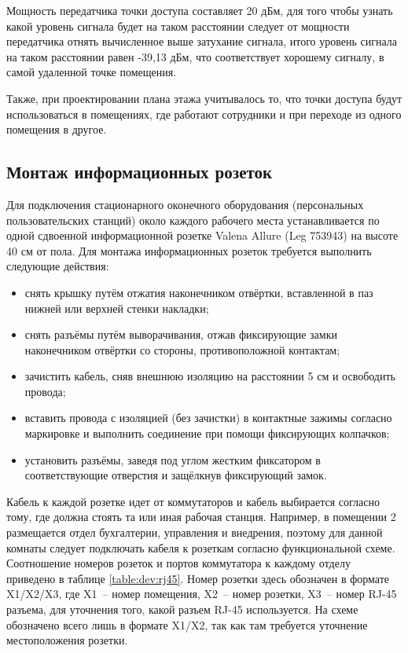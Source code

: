 Мощность передатчика точки доступа составляет 20 дБм, для того чтобы узнать какой уровень сигнала будет на таком 
расстоянии следует от мощности передатчика отнять вычисленное выше затухание сигнала, итого уровень сигнала на 
таком расстоянии равен -39,13 дБм, что соответствует хорошему сигналу, в самой удаленной точке помещения. 

Также, при проектировании плана этажа учитывалось то, что точки доступа будут использоваться в помещениях, где работают сотрудники
и при переходе из одного помещения в другое.

\subsection{Монтаж информационных розеток}

Для подключения стационарного оконечного оборудования (персональных пользовательских станций) около каждого рабочего места устанавливается 
по одной сдвоенной информационной розетке Valena Allure (Leg 753943) на высоте 40 см от пола. Для монтажа информационных розеток 
требуется выполнить следующие действия:

\begin{itemize}
    \item снять крышку путём отжатия наконечником отвёртки, вставленной в паз нижней или верхней стенки накладки;
    \item снять разъёмы путём выворачивания, отжав фиксирующие замки наконечником отвёртки со стороны, противоположной контактам;
    \item зачистить кабель, сняв внешнюю изоляцию на расстоянии 5 см и освободить провода;
    \item вставить провода с изоляцией (без зачистки) в контактные зажимы согласно маркировке и выполнить соединение при помощи фиксирующих колпачков;
    \item установить разъёмы, заведя под углом жестким фиксатором в соответствующие отверстия и защёлкнув фиксирующий замок.
\end{itemize}

Кабель к каждой розетке идет от коммутаторов и кабель выбирается согласно тому, где должна стоять та или иная рабочая станция.
Например, в помещении 2 размещается отдел бухгалтерии, управления и внедрения, поэтому для данной комнаты следует подключать кабеля к розеткам 
согласно функциональной схеме. Соотношение номеров розеток и портов коммутатора к каждому отделу приведено в таблице \ref{table:dev:rj45}. Номер розетки 
здесь обозначен в формате X1/X2/X3, где X1~-- номер помещения, X2~-- номер розетки, X3~-- номер RJ-45 разъема, для уточнения того,
какой разъем RJ-45 используется. На схеме \floor~ обозначено всего лишь в формате X1/X2, так как там требуется уточнение местоположения розетки.

